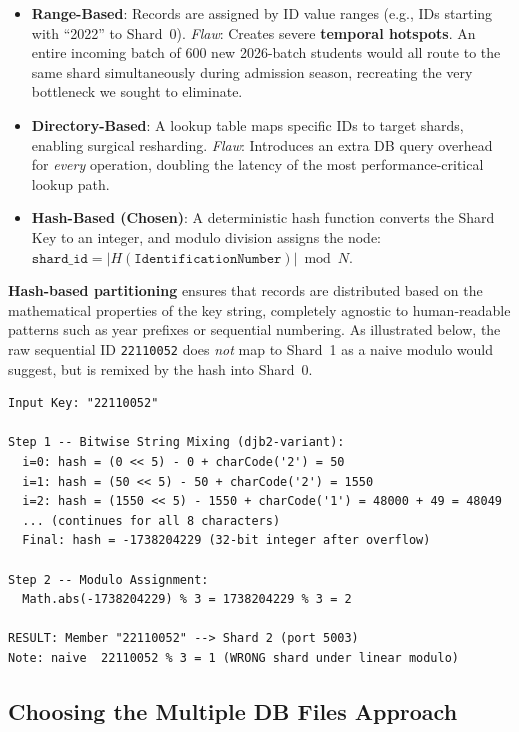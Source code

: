 \documentclass[sigconf]{acmart}
\begin{document}
\begin{itemize}[leftmargin=*]
    \item \textbf{Range-Based}: Records are assigned by ID value ranges (e.g., IDs starting with ``2022'' to Shard~0). \textit{Flaw}: Creates severe \textbf{temporal hotspots}. An entire incoming batch of 600 new 2026-batch students would all route to the same shard simultaneously during admission season, recreating the very bottleneck we sought to eliminate.
    \item \textbf{Directory-Based}: A lookup table maps specific IDs to target shards, enabling surgical resharding. \textit{Flaw}: Introduces an extra DB query overhead for \textit{every} operation, doubling the latency of the most performance-critical lookup path.
    \item \textbf{Hash-Based (Chosen)}: A deterministic hash function converts the Shard Key to an integer, and modulo division assigns the node: $\texttt{shard\_id} = |H(\texttt{IdentificationNumber})| \bmod N$.
\end{itemize}

\textbf{Hash-based partitioning} ensures that records are distributed based on the mathematical properties of the key string, completely agnostic to human-readable patterns such as year prefixes or sequential numbering. As illustrated below, the raw sequential ID \texttt{22110052} does \textit{not} map to Shard~1 as a naive modulo would suggest, but is remixed by the hash into Shard~0.

\begin{lstlisting}[style=logstyle, caption={Hash-Based Shard Assignment: Tracing a Member ID}]
Input Key: "22110052"

Step 1 -- Bitwise String Mixing (djb2-variant):
  i=0: hash = (0 << 5) - 0 + charCode('2') = 50
  i=1: hash = (50 << 5) - 50 + charCode('2') = 1550
  i=2: hash = (1550 << 5) - 1550 + charCode('1') = 48000 + 49 = 48049
  ... (continues for all 8 characters)
  Final: hash = -1738204229 (32-bit integer after overflow)

Step 2 -- Modulo Assignment:
  Math.abs(-1738204229) % 3 = 1738204229 % 3 = 2

RESULT: Member "22110052" --> Shard 2 (port 5003)
Note: naive  22110052 % 3 = 1 (WRONG shard under linear modulo)
\end{lstlisting}

\subsection{Choosing the Multiple DB Files Approach}
\label{subsec:multidb}
\end{document}
